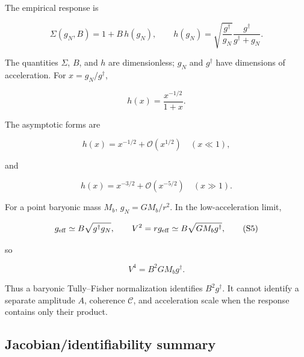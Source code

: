 \documentclass[utf8]{frontiers_suppmat}
\begin{document}
The empirical response is

\[
\Sigma(g_N,B)=1+B\,h(g_N),
\qquad
h(g_N)=\sqrt{\frac{g^\dagger}{g_N}}
\frac{g^\dagger}{g^\dagger+g_N}.
\tag{S1}
\]

The quantities \(\Sigma\), \(B\), and \(h\) are dimensionless; \(g_N\) and \(g^\dagger\) have dimensions of acceleration. For \(x=g_N/g^\dagger\),

\[
h(x)=\frac{x^{-1/2}}{1+x}.
\tag{S2}
\]

The asymptotic forms are

\[
h(x)=x^{-1/2}+\mathcal O(x^{1/2})
\quad (x\ll1),
\tag{S3}
\]

and

\[
h(x)=x^{-3/2}+\mathcal O(x^{-5/2})
\quad (x\gg1).
\tag{S4}
\]

For a point baryonic mass \(M_b\), \(g_N=GM_b/r^2\). In the low-acceleration limit,

\[
g_{\rm eff}\simeq B\sqrt{g^\dagger g_N},
\qquad
V^2=r g_{\rm eff}\simeq B\sqrt{GM_b g^\dagger},
\tag{S5}
\]

so

\[
V^4=B^2GM_b g^\dagger.
\tag{S6}
\]

Thus a baryonic Tully--Fisher normalization identifies \(B^2g^\dagger\). It cannot identify a separate amplitude \(A\), coherence \(\mathcal C\), and acceleration scale when the response contains only their product.

\subsection{Jacobian/identifiability summary}\label{s2.1-jacobianidentifiability-summary}
\end{document}
